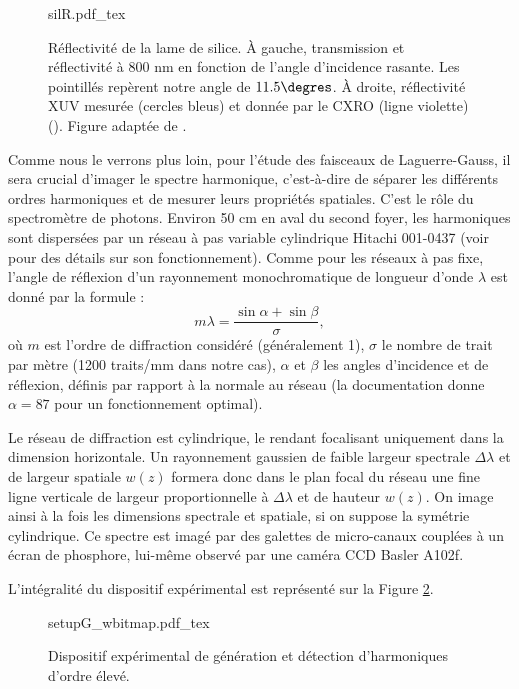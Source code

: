 \begin{enumerate}
\begin{figure}[!ht]
\centering
\def\svgwidth{\columnwidth}
{silR.pdf_tex}
\caption{Réflectivité de la lame de silice. \`{A} gauche, transmission et réflectivité à 800 nm en fonction de l'angle d'incidence rasante. Les pointillés repèrent notre angle de $11.5\degres$. \`{A} droite, réflectivité XUV mesurée (cercles bleus) et donnée par le CXRO (ligne violette) (). Figure adaptée de .}
\label{Fig:SilR}
\end{figure}
\end{enumerate}

Comme nous le verrons plus loin, pour l'étude des faisceaux de Laguerre-Gauss, il sera crucial d'imager le spectre harmonique, c'est-à-dire de séparer les différents ordres harmoniques et de mesurer leurs propriétés spatiales. C'est le rôle du spectromètre de photons. Environ 50 cm en aval du second foyer, les harmoniques sont dispersées par un réseau à pas variable cylindrique Hitachi 001-0437 (voir  pour des détails sur son fonctionnement). Comme pour les réseaux à pas fixe, l'angle de réflexion d'un rayonnement monochromatique de longueur d'onde $\lambda$ est donné par la formule :
\begin{equation*}
m\lambda=\frac{\sin{\alpha}+\sin{\beta}}{\sigma},
\end{equation*}
où $m$ est l'ordre de diffraction considéré (généralement 1), $\sigma$ le nombre de trait par mètre (1200 traits/mm dans notre cas), $\alpha$ et $\beta$ les angles d'incidence et de réflexion, définis par rapport à la normale au réseau (la documentation donne $\alpha = 87$\degres{} pour un fonctionnement optimal).\par
Le réseau de diffraction est cylindrique, le rendant focalisant uniquement dans la dimension horizontale. Un rayonnement gaussien de faible largeur spectrale $\Delta\lambda$ et de largeur spatiale $w(z)$ formera donc dans le plan focal du réseau une fine ligne verticale de largeur proportionnelle à $\Delta\lambda$ et de hauteur $w(z)$. On image ainsi à la fois les dimensions spectrale et spatiale, si on suppose la symétrie cylindrique. Ce spectre est imagé par des galettes de micro-canaux couplées à un écran de phosphore, lui-même observé par une caméra CCD Basler A102f. 

L'intégralité du dispositif expérimental est représenté sur la Figure \ref{Fig:ExpG}.

\vspace{\baselineskip}
\begin{figure}[!ht]
\centering
\def\svgwidth{\columnwidth}
{setupG_wbitmap.pdf_tex}
\caption{Dispositif expérimental de génération et détection d'harmoniques d'ordre élevé.}
\label{Fig:ExpG}
\end{figure}

